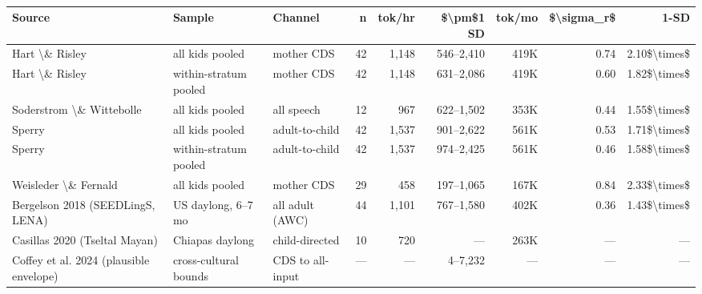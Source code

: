 \documentclass[
  11pt,
]{article}
\begin{document}
\begingroup\fontsize{8}{10}\selectfont

\begin{longtable}[t]{lllrrrrrr}

\caption{\label{tbl-input-rates}}

\tabularnewline

\toprule
Source & Sample & Channel & n & tok/hr & \$\textbackslash{}pm\$1 SD & tok/mo & \$\textbackslash{}sigma\_r\$ & 1-SD\\
\midrule
Hart \textbackslash{}\& Risley & all kids pooled & mother CDS & 42 & 1,148 & 546--2,410 & 419K & 0.74 & 2.10\$\textbackslash{}times\$\\
Hart \textbackslash{}\& Risley & within-stratum pooled & mother CDS & 42 & 1,148 & 631--2,086 & 419K & 0.60 & 1.82\$\textbackslash{}times\$\\
Soderstrom \textbackslash{}\& Wittebolle & all kids pooled & all speech & 12 & 967 & 622--1,502 & 353K & 0.44 & 1.55\$\textbackslash{}times\$\\
Sperry & all kids pooled & adult-to-child & 42 & 1,537 & 901--2,622 & 561K & 0.53 & 1.71\$\textbackslash{}times\$\\
Sperry & within-stratum pooled & adult-to-child & 42 & 1,537 & 974--2,425 & 561K & 0.46 & 1.58\$\textbackslash{}times\$\\
\addlinespace
Weisleder \textbackslash{}\& Fernald & all kids pooled & mother CDS & 29 & 458 & 197--1,065 & 167K & 0.84 & 2.33\$\textbackslash{}times\$\\
Bergelson 2018 (SEEDLingS, LENA) & US daylong, 6--7 mo & all adult (AWC) & 44 & 1,101 & 767--1,580 & 402K & 0.36 & 1.43\$\textbackslash{}times\$\\
Casillas 2020 (Tseltal Mayan) & Chiapas daylong & child-directed & 10 & 720 & — & 263K & — & —\\
Coffey et al. 2024 (plausible envelope) & cross-cultural bounds & CDS to all-input & — & — & 4--7,232 & — & — & —\\
\bottomrule

\end{longtable}

\endgroup{}
\end{document}
